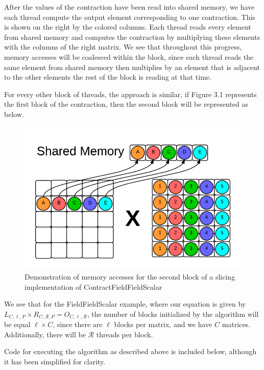     After the values of the contraction have been read into shared memory, we
have each thread compute the output element corresponding to one contraction.
This is shown on the right by the colored columns. Each thread reads every
element from shared memory and computes the contraction by multiplying these
elements with the columns of the right matrix. We see that throughout this
progress, memory accesses will be coalesced within the block, since each thread
reads the same element from shared memory then multiplies by an element that is
adjacent to the other elements the rest of the block is reading at that time. 
	
    For every other block of threads, the approach is similar, if Figure 3.1
represents the first block of the contraction, then the second block will be
represented as below. 

\begin{figure}[b]
    \centering
    \includegraphics[scale = .55]{ContractFieldFieldScalarGraphic2}
    \caption{Demonstration of memory accesses for the second block of a slicing implementation of ContractFieldFieldScalar}
\end{figure}

We see that for the FieldFieldScalar example, where our equation is given by
$L_{C,\ell,P} \times R_{C, \mathcal{R}, P} = O_{C,\ell, \mathcal{R}}$, the
number of blocks initialized by the algorithm will be equal $\ell \times C$,
since there are $\ell$ blocks per matrix, and we have $C$ matrices.
Additionally, there will be $\mathcal{R}$ threads per block. 

    Code for executing the algorithm as described above is included below,
although it has been simplified for clarity. 


